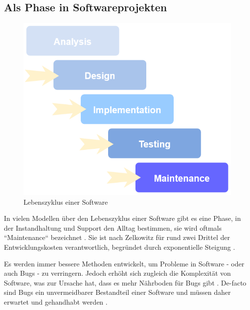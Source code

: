 
\subsection{Als Phase in Softwareprojekten}

	\begin{figure}
		\centering
		\vspace{-\baselineskip}
		\includegraphics[width=\linewidth]{img/02_maintenance/software-life-cycle.png}
		\caption{Lebenszyklus einer Software}
		\label{fig:software-development-life-cycle}
	\end{figure}
	
	In vielen Modellen über den Lebenszyklus einer Software gibt es eine Phase, in der Instandhaltung und Support den Alltag bestimmen, sie wird oftmals ``Maintenance`` bezeichnet \cite{ManagingTheComplexityOfWebSystemsDevelopment} \cite{ASimulationModelWaterfallSoftware}. Sie ist nach Zelkowitz \etal \cite{PrinciplesOfSoftwareEngineeringAndDesign} für rund zwei Drittel der Entwicklungskosten verantwortlich, begründet durch exponentielle Steigung \cite{ExtremeProgrammingExplained}.
	
	Es werden immer bessere Methoden entwickelt, um Probleme in Software - oder auch Bugs - zu verringern. Jedoch erhöht sich zugleich die Komplexität von Software, was zur Ursache hat, dass es mehr Nährboden für Bugs gibt \cite{TrackingDownSoftwareBugsAnomalyDetection}. De-facto sind Bugs ein unvermeidbarer Bestandteil einer Software und müssen daher erwartet und gehandhabt werden \cite{TheMythicalManMonth}.
	

